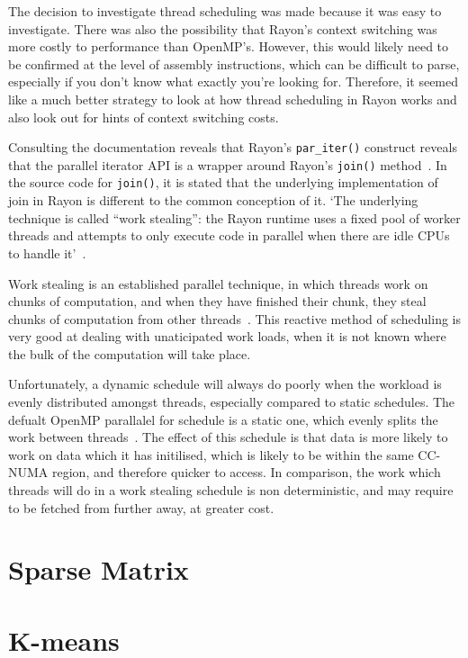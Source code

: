 The decision to investigate thread scheduling was made because it was easy to investigate. There was also the possibility that Rayon's context switching was more costly to performance than OpenMP's. However, this would likely need to be confirmed at the level of assembly instructions, which can be difficult to parse, especially if you don't know what exactly you're looking for. Therefore, it seemed like a much better strategy to look at how thread scheduling in Rayon works  and also look out for hints of context switching costs.

Consulting the documentation reveals that Rayon's \texttt{par\_iter()} construct reveals that the parallel iterator API is a wrapper around Rayon's \texttt{join()} method~\cite{smallCult}. In the source code for \texttt{join()}, it is stated that the underlying implementation of join in Rayon is different to the common conception of it. 
`The underlying technique is called ``work stealing'': the
Rayon runtime uses a fixed pool of worker threads and attempts to only execute code in parallel when there are idle CPUs to handle it'~\cite{joinSrc}.

Work stealing is an established parallel technique, in which threads work on chunks of computation, and when they have finished their chunk, they steal chunks of computation from other threads~\cite{blumofe1999}. This reactive method of scheduling is very good at dealing with unaticipated work loads, when it is not known where the bulk of the computation will take place.

Unfortunately, a dynamic schedule will always do poorly when the workload is evenly distributed amongst threads, especially compared to static schedules. The defualt OpenMP parallalel for schedule is a static one, which evenly splits the work between threads~\cite{OpenMPSpec5}. The effect of this schedule is that data is more likely to work on data which it has initilised, which is likely to be within the same CC-NUMA region, and therefore quicker to access. In comparison, the work which threads will do in a work stealing schedule is non deterministic, and may require to be fetched from further away, at greater cost.

\section{Sparse Matrix}\label{sec:res-sparse}
\section{K-means}
